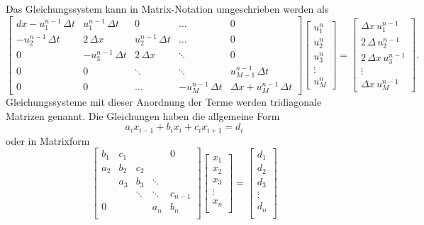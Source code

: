 	Das Gleichungssystem kann in Matrix-Notation umgeschrieben werden als
	\begin{equation}
	\left[{\begin{matrix}
	{dx- u_{1}^{n-1}\, \Delta t}&{ u_{1}^{n-1} \, \Delta t}&{0}&{\dots}&{0}\\[5pt]
	{-u_{2}^{n-1} \, \Delta t}&{ 2 \, \Delta x}&{ u_{2}^{n-1} \, \Delta t}&{\dots}&{0}\\[5pt]
	{0}&{-u_{3}^{n-1} \, \Delta t}&{ 2 \, \Delta x}&\ddots &{0}\\[5pt]
	{0}&{0}&\ddots &\ddots &{ u_{M-1}^{n-1} \, \Delta t}\\[5pt]
	{0}&{0}&{\dots}&{-u_{M}^{n-1} \, \Delta t}&{\Delta x + u_{M}^{n-1}\, \Delta t}
	\end{matrix}}
	\right]\left[{\begin{matrix}
	{ u_{1}^{n}}\\[5pt]
	{ u_{2}^{n}}\\[5pt]
	{ u_{3}^{n}}\\[5pt]
	\vdots \\[5pt]
	{ u_{M}^{n}}
	\end{matrix}}\right]
	=\left[{\begin{matrix}
	{\Delta x \, u_{1}^{n-1}}\\[5pt]
	{ 2 \, \Delta  \, u_{2}^{n-1}}\\[5pt]
	{ 2 \, \Delta x \, u_{3}^{n-1}}\\[5pt]
	\vdots \\[5pt]
	{\Delta x \, u_{M}^{n-1}}
	\end{matrix}}\right].
	  \end{equation}
	Gleichungssysteme mit dieser Anordnung der Terme werden tridiagonale Matrizen genannt.
	Die Gleichungen haben die allgemeine Form
	  \begin{equation}
	    a_{i}x_{{i-1}}+b_{i}x_{i}+c_{i}x_{{i+1}}=d_{i}
	  \end{equation}
	oder in Matrixform
	  \begin{equation}
	    \begin{bmatrix}{b_{1}}&{c_{1}}&{}&{}&{0}\\
	      {a_{2}}&{b_{2}}&{c_{2}}&{}&{}\\
	      {}&{a_{3}}&{b_{3}}&\ddots &{}\\
	      {}&{}&\ddots &\ddots &{c_{n-1}}\\
	      {0}&{}&{}&{a_{n}}&{b_{n}}\\
	      \end{bmatrix}
	      \begin{bmatrix}{x_{1}}\\
	      {x_{2}}\\{x_{3}}\\\vdots \\
	      {x_{n}}\\
	      \end{bmatrix}
	      =
	      \begin{bmatrix}{d_{1}}\\
	      {d_{2}}\\{d_{3}}\\
	      \vdots \\{d_{n}}\\
	    \end{bmatrix}
	  \end{equation}
